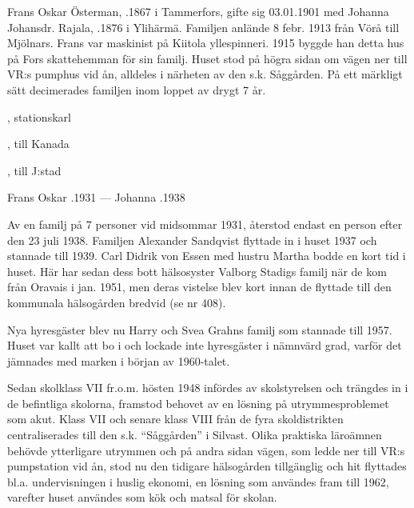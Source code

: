 Frans Oskar Österman, .1867 i Tammerfors, gifte sig 03.01.1901 med Johanna Johansdr. Rajala, .1876 i Ylihärmä.
Familjen anlände 8 febr. 1913 från Vörå till Mjölnars. Frans var maskinist på Kiitola yllespinneri. 1915 byggde han detta hus på Fors skattehemman för sin familj. Huset stod på högra sidan om vägen ner till VR:s pumphus vid ån, alldeles i närheten av den s.k. Såggården. På ett märkligt sätt decimerades familjen inom loppet av drygt 7 år.
\begin{jhchildren}
  \item {}
  \item {}, stationskarl
  \item {}, till Kanada
  \item {}, till J:stad
  \item {}
\end{jhchildren}

Frans Oskar .1931  ---  Johanna .1938

Av en familj på 7 personer vid midsommar 1931, återstod endast en person efter den 23 juli 1938. Familjen Alexander Sandqvist flyttade in i huset 1937 och stannade till 1939.  Carl Didrik von Essen med hustru Martha bodde en kort tid i huset. Här har sedan dess bott hälsosyster Valborg Stadigs familj när de kom från Oravais i jan. 1951, men deras vistelse blev kort innan de flyttade till den kommunala hälsogården bredvid (se nr 408).

Nya hyresgäster blev nu Harry och Svea Grahns familj som stannade till 1957. Huset var kallt att bo i och lockade inte hyresgäster i nämnvärd grad, varför det jämnades med marken i början av 1960-talet.






Sedan skolklass VII fr.o.m. hösten 1948 infördes av skolstyrelsen och trängdes in i de befintliga skolorna, framstod behovet av en lösning på utrymmesproblemet som akut. Klass VII och senare klass VIII från de fyra skoldistrikten centraliserades till  den s.k. ``Såggården'' i Silvast. Olika praktiska läroämnen behövde ytterligare utrymmen och på andra sidan vägen, som ledde ner till VR:s pumpstation vid ån, stod nu den tidigare hälsogården tillgänglig och hit flyttades bl.a. undervisningen i huslig ekonomi, en lösning som användes fram till 1962, varefter huset användes som kök och matsal för skolan.

